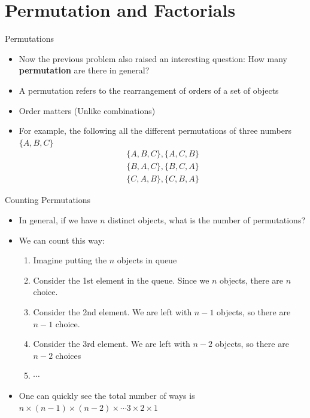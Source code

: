 \documentclass[10pt,xcolor={table,dvipsnames},t]{beamer}
\begin{document}
\section{Permutation and Factorials}
\begin{frame}{Permutations}
  \begin{itemize}
    \item Now the previous problem also raised an interesting question: How many \textbf{permutation} are there in general?
    \item A permutation refers to the rearrangement of orders of a set of objects
    \item Order matters (Unlike combinations)
    \item For example, the following all the different permutations of three numbers $\{A,B,C\}$
    \begin{align*}
      \{A,B,C\},\{A,C,B\}\\
      \{B,A,C\},\{B,C,A\}\\
      \{C,A,B\},\{C,B,A\}
    \end{align*}
  \end{itemize}
\end{frame}

\begin{frame}{Counting Permutations}
  \begin{itemize}
    \item In general, if we have $n$ distinct objects, what is the number of permutations?
    \item We can count this way:
    \begin{enumerate}
      \item Imagine putting the $n$ objects in queue
      \item Consider the 1st element in the queue. Since we $n$ objects, there are $n$ choice.
      \item Consider the 2nd element. We are left with $n-1$ objects, so there are $n-1$ choice. 
      \item Consider the 3rd element. We are left with $n-2$ objects, so there are $n-2$ choices 
      \item $\cdots$
    \end{enumerate}
    \item One can quickly see the total number of ways is $n\times(n-1)\times(n-2)\times\cdots 3\times 2\times 1$
  \end{itemize}
\end{frame}
\end{document}
